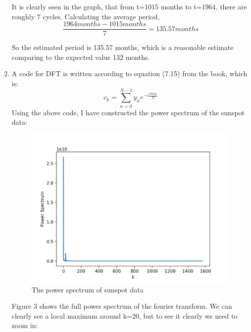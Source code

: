 \documentclass[12pt,letterpaper]{article}
\begin{document}
\begin{enumerate}
    It is clearly seen in the graph, that from t=1015 months to t=1964, there are roughly 7 cycles. Calculating the average period,
    \begin{equation}
        \frac{1964  months - 1015  months}{7}=135.57  months
    \end{equation}
    
    So the estimated period is 135.57 months, which is a reasonable estimate comparing to the expected value 132 months.
  \item
    A code for DFT is written according to equation (7.15) from the book, which is:
    \begin{equation}
        c_k=\sum_{n=0}^{N-1}  y_n e^{ -i\frac{2\pi k n }{N}   }
    \end{equation}
    Using the above code, I have constructed the power spectrum of the sunspot data:
    \clearpage

    \begin{figure}[h]
    \centering
    \includegraphics[width=1\linewidth]{q1c.png}
    \caption{The power spectrum of sunspot data}
    \end{figure}
     Figure 3 shows the full power spectrum of the fourier transform. We can clearly see a local maximum around k=20, but to see it clearly we need to zoom in:


\end{enumerate}
\end{document}
